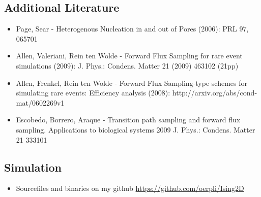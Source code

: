 \documentclass{beamer}
\begin{document}
\subsection{Additional Literature}
\begin{frame}
\begin{itemize}
\item Page, Sear - Heterogenous Nucleation in and out of Pores (2006): PRL 97, 065701
\item Allen, Valeriani, Rein ten Wolde - Forward Flux Sampling for rare event simulations (2009): J. Phys.: Condens. Matter 21 (2009) 463102 (21pp)
\item Allen, Frenkel, Rein ten Wolde - Forward Flux Sampling-type schemes for simulating rare events: Efficiency analysis (2008): http://arxiv.org/abs/cond-mat/0602269v1
\item Escobedo, Borrero, Araque -  Transition path sampling and forward flux sampling. Applications to biological systems 2009 J. Phys.: Condens. Matter 21 333101
\end{itemize}
\end{frame}
\subsection{Simulation}
\begin{frame}
\begin{itemize}
\item Sourcefiles and binaries on my github \href{https://github.com/oerpli/Ising2D}{https://github.com/oerpli/Ising2D}
\end{itemize}
\end{frame}
\end{document}
